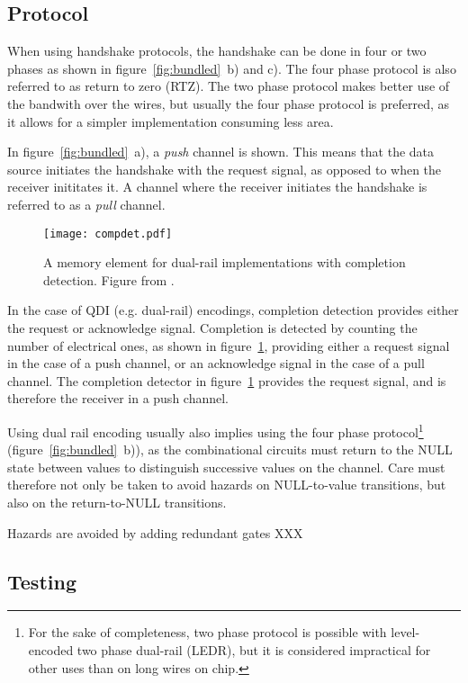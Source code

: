 \subsection{Protocol}

When using handshake protocols, the handshake can be done in four or
two phases as shown in figure~\ref{fig:bundled}~b) and c). The four
phase protocol is also referred to as return to zero (RTZ). The two
phase protocol makes better use of the bandwith over the wires, but
usually the four phase protocol is preferred, as it allows for a
simpler implementation consuming less area.

In figure~\ref{fig:bundled}~a), a \emph{push} channel is shown. This
means that the data source initiates the handshake with the request
signal, as opposed to when the receiver inititates it. A channel where
the receiver initiates the handshake is referred to as a \emph{pull}
channel.

\begin{figure}[htbp]
  \centering
  \texttt{[image: compdet.pdf]}
  \caption{A memory element for dual-rail implementations with
    completion detection. Figure from \cite[pp. 21]{sparso}.}
  \label{fig:compdet}
\end{figure}

In the case of QDI (e.g. dual-rail) encodings, completion detection
provides either the request or acknowledge signal. Completion is
detected by counting the number of electrical ones, as shown in
figure~\ref{fig:compdet}, providing either a request signal in the
case of a push channel, or an acknowledge signal in the case of a pull
channel. The completion detector in figure~\ref{fig:compdet} provides
the request signal, and is therefore the receiver in a push channel.

Using dual rail encoding usually also implies using the four phase
protocol\footnote{For the sake of completeness, two phase protocol is
  possible with level-encoded two phase dual-rail (LEDR)\cite{ledr},
  but it is considered impractical for other uses than on long wires
  on chip.}  (figure~\ref{fig:bundled}~b)), as the combinational
circuits must return to the NULL state between values to distinguish
successive values on the channel. Care must therefore not only be
taken to avoid hazards on NULL-to-value transitions, but also on the
return-to-NULL transitions.

Hazards are avoided by adding redundant gates XXX

\subsection{Testing}

